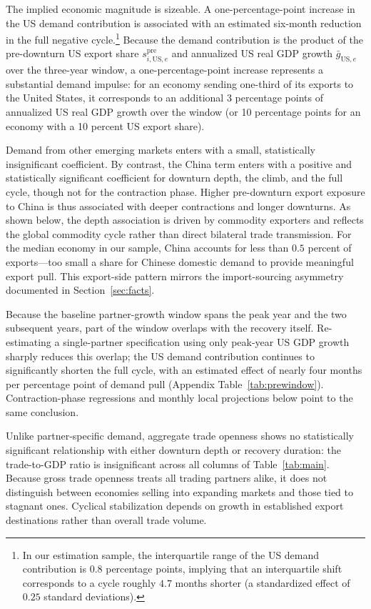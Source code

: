 \documentclass[12pt, a4paper]{article}
\begin{document}
The implied economic magnitude is sizeable. A one-percentage-point increase in the US demand contribution is associated with an estimated six-month reduction in the full negative cycle.\footnote{In our estimation sample, the interquartile range of the US demand contribution is $0.8$ percentage points, implying that an interquartile shift corresponds to a cycle roughly $4.7$ months shorter (a standardized effect of $0.25$ standard deviations).} Because the demand contribution is the product of the pre-downturn US export share $s_{i,\text{US},e}^{\text{pre}}$ and annualized US real GDP growth $\bar{g}_{\text{US},e}$ over the three-year window, a one-percentage-point increase represents a substantial demand impulse: for an economy sending one-third of its exports to the United States, it corresponds to an additional 3 percentage points of annualized US real GDP growth over the window (or 10 percentage points for an economy with a 10 percent US export share).

Demand from other emerging markets enters with a small, statistically insignificant coefficient. By contrast, the China term enters with a positive and statistically significant coefficient for downturn depth, the climb, and the full cycle, though not for the contraction phase. Higher pre-downturn export exposure to China is thus associated with deeper contractions and longer downturns. As shown below, the depth association is driven by commodity exporters and reflects the global commodity cycle rather than direct bilateral trade transmission. For the median economy in our sample, China accounts for less than $0.5$ percent of exports---too small a share for Chinese domestic demand to provide meaningful export pull. This export-side pattern mirrors the import-sourcing asymmetry documented in Section~\ref{sec:facts}.

Because the baseline partner-growth window spans the peak year and the two subsequent years, part of the window overlaps with the recovery itself. Re-estimating a single-partner specification using only peak-year US GDP growth sharply reduces this overlap; the US demand contribution continues to significantly shorten the full cycle, with an estimated effect of nearly four months per percentage point of demand pull (Appendix Table~\ref{tab:prewindow}). Contraction-phase regressions and monthly local projections below point to the same conclusion.



Unlike partner-specific demand, aggregate trade openness shows no statistically significant relationship with either downturn depth or recovery duration: the trade-to-GDP ratio is insignificant across all columns of Table~\ref{tab:main}. Because gross trade openness treats all trading partners alike, it does not distinguish between economies selling into expanding markets and those tied to stagnant ones. Cyclical stabilization depends on growth in established export destinations rather than overall trade volume.
\end{document}
